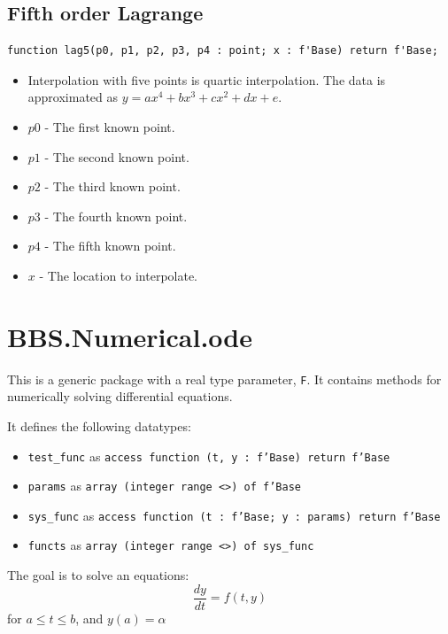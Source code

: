 \documentclass[10pt, openany]{book}
\newcommand{\indexfunc}[1]{\index[func]{#1}}
\newcommand{\datatype}[1]{\texttt{#1}}
\begin{document}
\subsection{Fifth order Lagrange}
\begin{lstlisting}
function lag5(p0, p1, p2, p3, p4 : point; x : f'Base) return f'Base;
\end{lstlisting}
\indexfunc{interp-lag5}
\begin{itemize}
  \item Interpolation with five points is quartic interpolation.  The data is approximated as $y = ax^4+bx^3+cx^2+dx+e$.
  \item $p0$ - The first known point.
  \item $p1$ - The second known point.
  \item $p2$ - The third known point.
  \item $p3$ - The fourth known point.
  \item $p4$ - The fifth known point.
  \item $x$ - The location to interpolate.
\end{itemize}

\section{BBS.Numerical.ode}
This is a generic package with a real type parameter, \datatype{F}.  It contains methods for numerically solving differential equations.

It defines the following datatypes:
\begin{itemize}
   \item \datatype{test\_func} as \datatype{access function (t, y : f'Base) return f'Base}
   \item \datatype{params} as \datatype{array (integer range <>) of f'Base}
   \item \datatype{sys\_func} as \datatype{access function (t : f'Base; y : params) return f'Base}
   \item \datatype{functs} as \datatype{array (integer range <>) of sys\_func}
\end{itemize}

The goal is to solve an equations:
\begin{displaymath}
  \frac{dy}{dt} = f(t, y)
\end{displaymath}
 for $a\leq t\leq b$, and $y(a) = \alpha$
 
\end{document}
